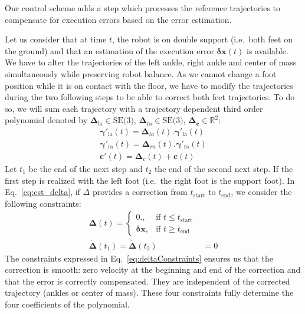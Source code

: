 Our control scheme adds a step which processes the reference trajectories to compensate for execution errors based on the error estimation.

Let us consider that at time $t$, the robot is on double support (i.e.\ both feet on the ground) and that an estimation of the execution error $\mathbf{\delta \mathbf{x}}(t)$ is available. We have to alter the trajectories of the left ankle, right ankle and center of mass simultaneously while preserving robot balance. As we cannot change a foot position while it is on contact with the floor, we have
to modify the trajectories during the two following steps to be able to correct both feet trajectories. To do so, we will sum each trajectory with a trajectory dependent third order polynomial denoted
by $\mathbf{\Delta}_{\text{la}} \in \text{SE(3)}$,
$\mathbf{\Delta}_{\text{ra}} \in \text{SE(3)}$,
$\mathbf{\Delta}_{\mathbf{c}} \in \mathbb{R}^2$:
%
\begin{equation}
  \begin{aligned}
    \mathbf{\gamma}'_{\text{la}}(t) = \mathbf{\Delta}_{la}(t) . \mathbf{\gamma}'_{\text{la}}(t)\\
    \mathbf{\gamma}'_{\text{ra}}(t) = \mathbf{\Delta}_{ra}(t) . \mathbf{\gamma}'_{\text{ra}}(t)\\
    \mathbf{c}'(t) = \mathbf{\Delta}_{c}(t) + \mathbf{c}(t)
  \end{aligned}
  \label{eq:cst_delta}
\end{equation}
%
Let $t_1$ be the end of the next step and $t_2$ the end of the second next step. If the first step is realized with the left foot (i.e.\ the right foot is the support foot). In Eq.~\ref{eq:cst_delta}, if
$\Delta$ provides a correction from $t_{\text{start}}$ to $t_{\text{end}}$, we consider the following constraints:
%
\begin{equation}
\begin{aligned}
  \mathbf{\Delta}(t) =
  \begin{cases}
    0.,  & \mbox{if }t\mbox{$\leq t_{\text{start}}$} \\
    \mathbf{\delta x}, & \mbox{if }t\mbox{$\geq t_{\text{end}}$}
  \end{cases}\\
  \dot{\mathbf{\Delta}}(t_1) = \dot{\mathbf{\Delta}}(t_2) &= 0
\end{aligned}
\label{eq:deltaConstraints}
\end{equation}
%
The constraints expressed in Eq.~\ref{eq:deltaConstraints} ensures us
that the correction is smooth: zero velocity at the beginning and end
of the correction and that the error is correctly compensated. They
are independent of the corrected trajectory (ankles or center of
mass). These four constraints fully determine the four coefficients of
the polynomial.

